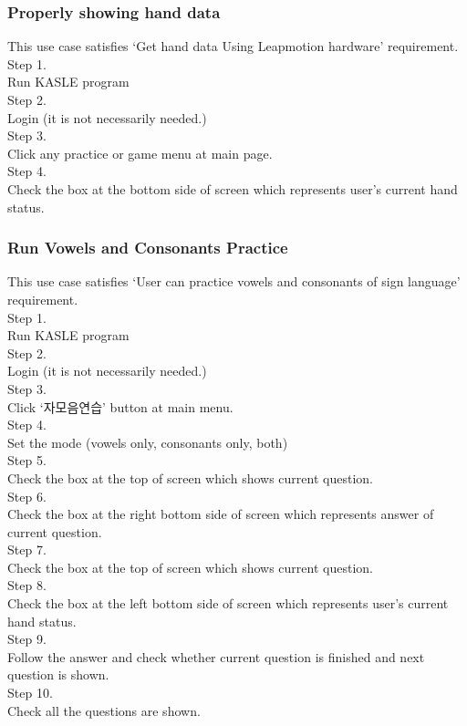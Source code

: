 \documentclass[10pt,journal,compsoc]{IEEEtran}
\begin{document}
\subsubsection{Properly showing hand data\\} 
This use case satisfies ‘Get hand data Using Leapmotion hardware’ requirement.
\\Step 1.
\\Run KASLE program
\\Step 2.
\\Login (it is not necessarily needed.)
\\Step 3.
\\Click any practice or game menu at main page.
\\Step 4. 
\\Check the box at the bottom side of screen which represents user’s current hand status.



\subsubsection{Run Vowels and Consonants Practice\\}
This use case satisfies ‘User can practice vowels and consonants of sign language’ requirement.
\\Step 1.
\\Run KASLE program
\\Step 2.
\\Login (it is not necessarily needed.)
\\Step 3.
\\Click ‘자모음연습’ button at main menu.
\\Step 4. 
\\Set the mode (vowels only, consonants only, both)
\\Step 5.
\\Check the box at the top of screen which shows current question.
\\Step 6.
\\Check the box at the right bottom side of screen which represents answer of current question.
\\Step 7.
\\Check the box at the top of screen which shows current question.
\\Step 8.
\\Check the box at the left bottom side of screen which represents user’s current hand status.
\\Step 9. 
\\Follow the answer and check whether current question is finished and next question is shown.
\\Step 10.
\\Check all the questions are shown.
\end{document}
